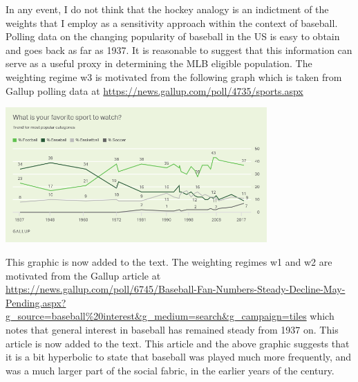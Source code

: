 \documentclass[11pt]{article}
\begin{document}
In any event, I do not think that the hockey analogy is an indictment 
of the weights that I employ as a sensitivity approach within the context of 
baseball.  Polling data on the changing popularity of baseball in the US is 
easy to obtain and goes back as far as 1937.  It is reasonable to suggest 
that this information can serve as a useful proxy in determining the MLB 
eligible population.  The weighting regime w3 is motivated from the following 
graph which is taken from Gallup polling data at 
\url{https://news.gallup.com/poll/4735/sports.aspx}

\begin{center}
\includegraphics[width=0.75\textwidth]{Gallupfavoritesport.png}
\end{center}
This graphic is now added to the text.
The weighting regimes w1 and w2 are motivated from the Gallup article at 
\url{https://news.gallup.com/poll/6745/Baseball-Fan-Numbers-Steady-Decline-May-Pending.aspx?g_source=baseball%20interest&g_medium=search&g_campaign=tiles}
which notes that general interest in baseball has remained steady from 
1937 on.  This article is now added to the text.  This article and the above 
graphic suggests that it is a bit hyperbolic to state that baseball was 
played much more frequently, and was a much larger part of the social fabric, 
in the earlier years of the century.
\end{document}
